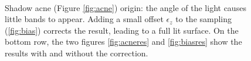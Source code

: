 \begin{figure}[!h]
\centering
{}
 \\

\caption{Shadow acne (Figure \ref{fig:acne}) origin: the angle of the light causes little bands to appear. Adding a small offset $\epsilon_z$ to the sampling (\ref{fig:bias}) corrects the result, leading to a full lit surface. On the bottom row, the two figures \ref{fig:acneres} and \ref{fig:biasres} show the results with and without the correction.}
\label{fig:shadowbias}
\end{figure}

